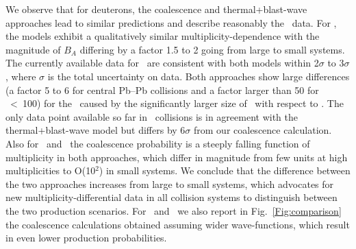 \documentclass[a4paper,11pt]{article}
\begin{document}
We observe that for deuterons, the coalescence and thermal+blast-wave approaches lead to similar predictions and describe reasonably the \PbPb~data. 
For \hethree, the models exhibit a qualitatively similar mul\-ti\-pli\-ci\-ty-dependence with the magnitude of $B_A$ differing by a factor 1.5 to 2 going from large to small systems. The currently available data for \hethree~are consistent with both models within 2$\sigma$ to 3$\sigma$, where $\sigma$ is the total uncertainty on data. 
Both approaches show large differences (a factor 5 to 6 for central Pb--Pb collisions and a factor larger than 50 for \avdNdeta~<~100) for the \hthreelambda\ caused by the significantly larger size of \hthreelambda\ with respect to \hethree. 
The only data point available so far in \PbPb~collisions is in agreement with the thermal+blast-wave model but differs by 6$\sigma$ from our coalescence calculation. 
Also for \hefour~and \hefourlambda~the coalescence probability is a steeply falling function of multiplicity in both approaches, which differ in magnitude from few units at high multiplicities to O(10$^{2}$) in small systems.
We conclude that the difference between the two approaches increases from large to small systems, which advocates for new multiplicity-differential data in all collision systems to distinguish between the two production scenarios. 
For \hthreelambda~and \hefourlambda~we also report in Fig.~\ref{Fig:comparison} the coalescence calculations obtained assuming wider wave-functions, which result in even lower production probabilities. 
\end{document}
